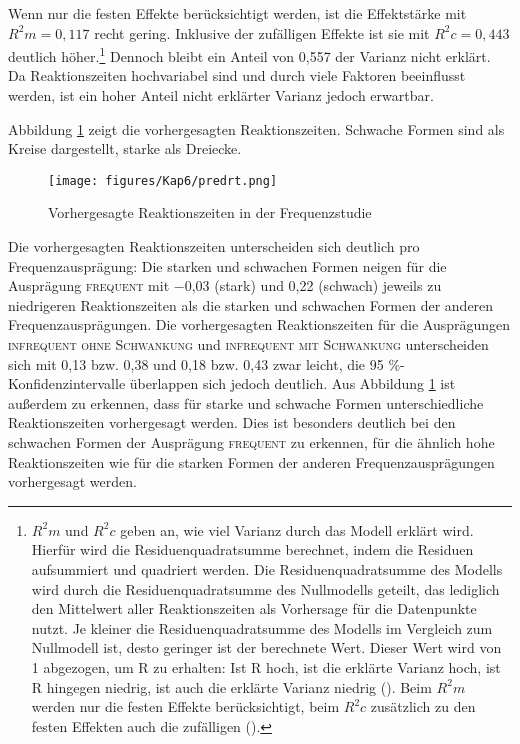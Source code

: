 Wenn nur die festen Effekte berücksichtigt werden, ist die Effektstärke mit $R^2m = 0{,}117$ recht gering. Inklusive der zufälligen Effekte ist sie mit $R^2c = 0{,}443$ deutlich höher.\footnote{$R^2m$ und $R^2c$ geben an, wie viel Varianz durch das Modell erklärt wird. Hierfür wird die Residuenquadratsumme berechnet, indem die Residuen aufsummiert und quadriert werden. Die Residuenquadratsumme des Modells wird durch die Residuenquadratsumme des Nullmodells geteilt, das lediglich den Mittelwert aller Reaktionszeiten als Vorhersage für die Datenpunkte nutzt. Je kleiner die Residuenquadratsumme des Modells im Vergleich zum Nullmodell ist, desto geringer ist der berechnete Wert. Dieser Wert wird von 1 abgezogen, um R zu erhalten: Ist R hoch, ist die erklärte Varianz hoch, ist R hingegen niedrig, ist auch die erklärte Varianz niedrig (\cite[75--77]{Winter.2020}). Beim $R^2m$ werden nur die festen Effekte berücksichtigt, beim $R^2c$ zusätzlich zu den festen Effekten auch die zufälligen (\cite[264]{Winter.2020}).}  Dennoch bleibt ein Anteil von 0,557 der Varianz nicht erklärt. Da Reaktionszeiten hochvariabel sind und durch viele Faktoren beeinflusst werden, ist ein hoher Anteil nicht erklärter Varianz jedoch erwartbar.

Abbildung \ref{predrtfreq1} zeigt die vorhergesagten Reaktionszeiten. Schwache Formen sind als Kreise dargestellt, starke als Dreiecke. 

\begin{figure}
\texttt{[image: figures/Kap6/predrt.png]} 
\caption{Vorhergesagte Reaktionszeiten in der Frequenzstudie}
\label{predrtfreq1}
\end{figure}

Die vorhergesagten Reaktionszeiten unterscheiden sich deutlich pro Frequenzausprägung: Die starken und schwachen Formen neigen für die Ausprägung \textsc{frequent} mit −0,03 (stark) und 0,22 (schwach) jeweils zu niedrigeren Reaktionszeiten als die starken und schwachen Formen der anderen Frequenzausprägungen. Die vorhergesagten Reaktionszeiten für die Ausprä\-gungen \textsc{infrequent ohne Schwankung} und \textsc{infrequent mit Schwankung} unterscheiden sich mit 0,13 bzw. 0,38 und 0,18 bzw. 0,43 zwar leicht, die 95 \%-Konfidenzintervalle überlappen sich jedoch deutlich. Aus Abbildung \ref{predrtfreq1} ist außerdem zu erkennen, dass für starke und schwache Formen unterschiedliche Reaktionszeiten vorhergesagt werden. Dies ist besonders deutlich bei den schwachen Formen der Ausprägung \textsc{frequent} zu erkennen, für die ähnlich hohe Reaktionszeiten wie für die starken Formen der anderen Frequenzausprägungen vorhergesagt werden.

